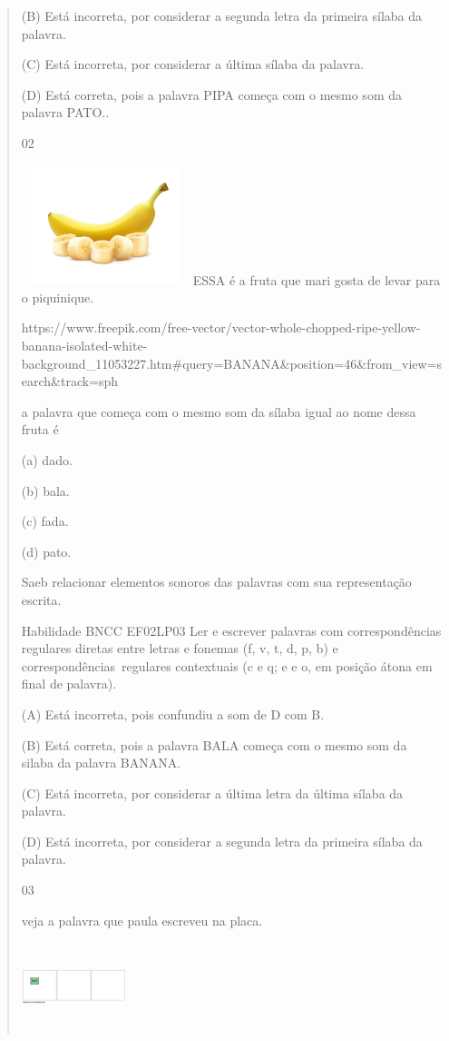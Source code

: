 {{{{\begin{verse}
{{\begin{escolha}
{{{{{(B) Está incorreta, por considerar a segunda letra da primeira sílaba da
palavra.

(C) Está incorreta, por considerar a última sílaba da palavra.

(D) Está correta, pois a palavra PIPA começa com o mesmo som da palavra
PATO..

\num{02}

\includegraphics[width=1.96704in,height=1.37153in]{media/image175.jpeg}ESSA
é a fruta que mari gosta de levar para o piquinique.

https://www.freepik.com/free-vector/vector-whole-chopped-ripe-yellow-banana-isolated-white-background\_11053227.htm\#query=BANANA\&position=46\&from\_view=search\&track=sph

a palavra que começa com o mesmo som da sílaba igual ao nome dessa fruta
é

(a) dado.

(b) bala.

(c) fada.

(d) pato.

Saeb relacionar elementos sonoros das palavras com sua representação
escrita.

Habilidade BNCC EF02LP03 Ler e escrever palavras com correspondências
regulares diretas entre letras e fonemas (f, v, t, d, p, b) e
correspondências~regulares contextuais (c e q; e e o, em posição átona
em final de palavra).

(A) Está incorreta, pois confundiu a som de D com B.

(B) Está correta, pois a palavra BALA começa com o mesmo som da silaba
da palavra BANANA.

(C) Está incorreta, por considerar a última letra da última sílaba da
palavra.

(D) Está incorreta, por considerar a segunda letra da primeira sílaba da
palavra.

\num{03}

veja a palavra que paula escreveu na placa.

\includegraphics[width=1.19861in,height=1.00625in]{media/image176.png}

}}}}}
\end{escolha}}}
\end{verse}}}}}
